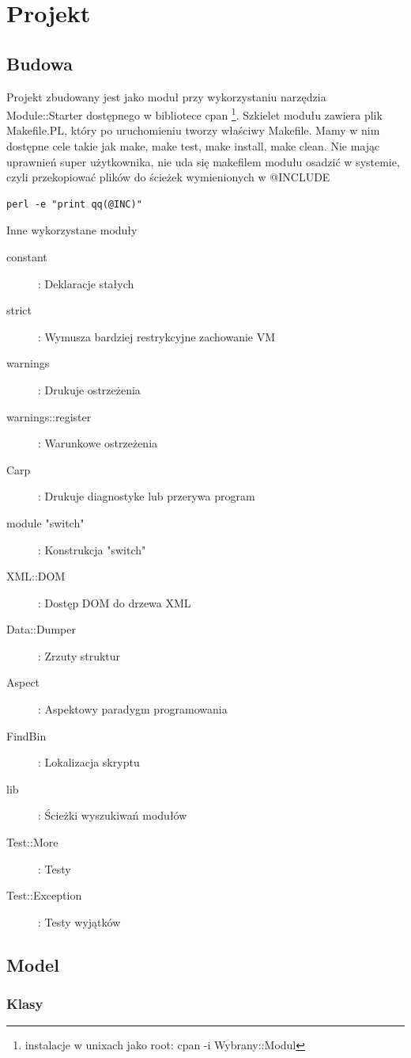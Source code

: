 \documentclass[a4paper,12pt]{article}
\begin{document}
\section{Projekt}

\subsection{Budowa}
Projekt zbudowany jest jako moduł przy wykorzystaniu narzędzia Module::Starter dostępnego w bibliotece cpan \footnote{instalacje w unixach jako root: cpan -i Wybrany::Modul}. Szkielet modułu zawiera plik Makefile.PL, który po uruchomieniu tworzy właściwy Makefile. Mamy w nim dostępne cele takie jak make, make test, make install, make clean. Nie mając uprawnień super użytkownika, nie uda się makefilem modułu osadzić w systemie, czyli przekopiować plików do ścieżek wymienionych w @INCLUDE
\begin{verbatim}
perl -e "print qq(@INC)"
\end{verbatim}
Inne wykorzystane moduły
\begin{description}
	\item[constant]: Deklaracje stałych
	\item[strict]: Wymusza bardziej restrykcyjne zachowanie VM
	\item[warnings]: Drukuje ostrzeżenia
	\item[warnings::register]: Warunkowe ostrzeżenia
	\item[Carp]: Drukuje diagnostyke lub przerywa program
	\item[module "switch"]: Konstrukcja "switch"
	\item[XML::DOM]: Dostęp DOM do drzewa XML
	\item[Data::Dumper]: Zrzuty struktur
	\item[Aspect]: Aspektowy paradygm programowania
	\item[FindBin]: Lokalizacja skryptu
	\item[lib]: Ścieżki wyszukiwań modułów
	\item[Test::More]: Testy
	\item[Test::Exception]: Testy wyjątków
\end{description}

\newpage
\subsection{Model}

\subsubsection{Klasy}
\end{document}
